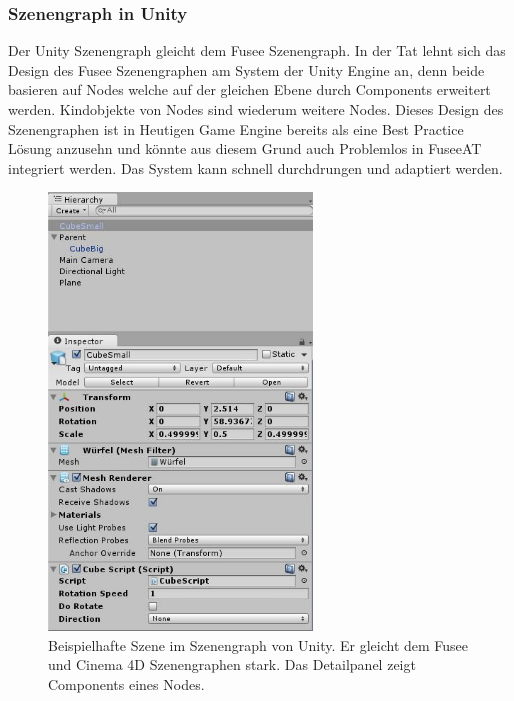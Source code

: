 \documentclass[pagesize, paper=a4, fontsize=12pt, titlepage=true, headings=small, headnosepline, abstractoff, liststotoc, nochapterprefix, plainheadsepline, twoside]{scrreprt}
\begin{document}
\subsubsection{Szenengraph in Unity}
Der Unity Szenengraph gleicht dem Fusee Szenengraph. In der Tat lehnt sich das Design des Fusee Szenengraphen am System der Unity Engine an, denn beide basieren auf Nodes welche auf der gleichen Ebene durch Components erweitert werden. Kindobjekte von Nodes sind wiederum weitere Nodes. Dieses Design des Szenengraphen ist in Heutigen Game Engine bereits als eine Best Practice Lösung anzusehn und könnte aus diesem Grund auch Problemlos in FuseeAT integriert werden. Das System kann schnell durchdrungen und adaptiert werden.
\begin{figure}[ht]
	\centering
	\includegraphics[width=7cm]{Bilder/uSzeneGraphDetails.jpg}
	\caption{Beispielhafte Szene im Szenengraph von Unity. Er gleicht dem Fusee und Cinema 4D Szenengraphen stark. Das Detailpanel zeigt Components eines Nodes.}
	\label{UnitySzenengraph}
\end{figure}
\end{document}

